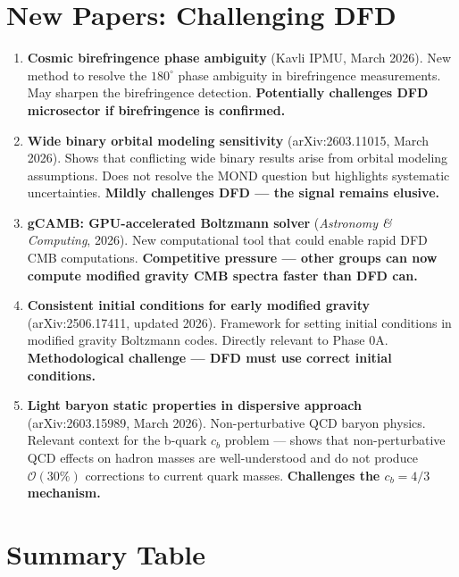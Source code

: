 \documentclass[11pt,a4paper]{article}
\begin{document}
\section{New Papers: Challenging DFD}

\begin{enumerate}[resume]
\item \textbf{Cosmic birefringence phase ambiguity} (Kavli IPMU, March 2026). New method to resolve the $180^\circ$ phase ambiguity in birefringence measurements. May sharpen the birefringence detection. \textbf{Potentially challenges DFD microsector if birefringence is confirmed.}

\item \textbf{Wide binary orbital modeling sensitivity} (arXiv:2603.11015, March 2026). Shows that conflicting wide binary results arise from orbital modeling assumptions. Does not resolve the MOND question but highlights systematic uncertainties. \textbf{Mildly challenges DFD --- the signal remains elusive.}

\item \textbf{gCAMB: GPU-accelerated Boltzmann solver} (\textit{Astronomy \& Computing}, 2026). New computational tool that could enable rapid DFD CMB computations. \textbf{Competitive pressure --- other groups can now compute modified gravity CMB spectra faster than DFD can.}

\item \textbf{Consistent initial conditions for early modified gravity} (arXiv:2506.17411, updated 2026). Framework for setting initial conditions in modified gravity Boltzmann codes. Directly relevant to Phase 0A. \textbf{Methodological challenge --- DFD must use correct initial conditions.}

\item \textbf{Light baryon static properties in dispersive approach} (arXiv:2603.15989, March 2026). Non-perturbative QCD baryon physics. Relevant context for the b-quark $c_b$ problem --- shows that non-perturbative QCD effects on hadron masses are well-understood and do not produce $\mathcal{O}(30\%)$ corrections to current quark masses. \textbf{Challenges the $c_b = 4/3$ mechanism.}
\end{enumerate}

\section{Summary Table}
\end{document}
